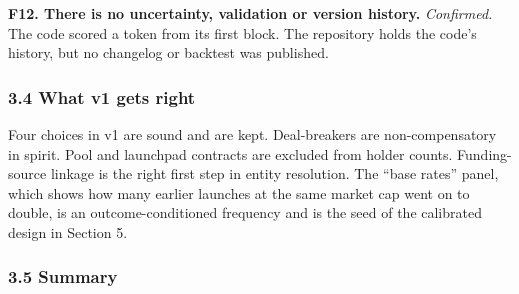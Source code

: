 \textbf{F12. There is no uncertainty, validation or version history.} \emph{Confirmed.} The code scored a token from its first block. The repository holds the code's history, but no changelog or backtest was published.

\subsubsection{3.4 What v1 gets right}\label{what-v1-gets-right}

Four choices in v1 are sound and are kept. Deal-breakers are non-compensatory in spirit. Pool and launchpad contracts are excluded from holder counts. Funding-source linkage is the right first step in entity resolution. The ``base rates'' panel, which shows how many earlier launches at the same market cap went on to double, is an outcome-conditioned frequency and is the seed of the calibrated design in Section 5.

\subsubsection{3.5 Summary}\label{summary}

